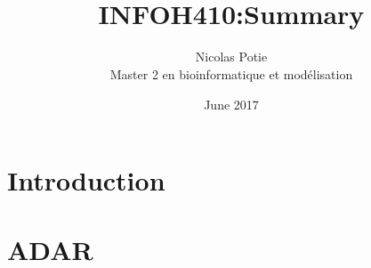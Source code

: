 \documentclass{article}
\author{Nicolas Potie\\ Master 2 en bioinformatique et modélisation}
\title{\\INFOH410:Summary}
\date{June 2017}
\makeatletter
\def\maketitle{%
  \null
  \thispagestyle{empty}%
  \vfill
  \begin{center}\leavevmode
    \normalfont
    \texttt{[image: ./ulb.jpg]}
    {\LARGE \@title\par}%
    \vskip 0.5cm
    {\Large \@author\par}%
    \vskip 0.5cm
    {\Large \@date\par}%
  \end{center}%
  \vfill
  \null
  \newpage
  }
\makeatother
\begin{document}
\pagebreak

\section{Introduction}

\section{ADAR}
\end{document}
